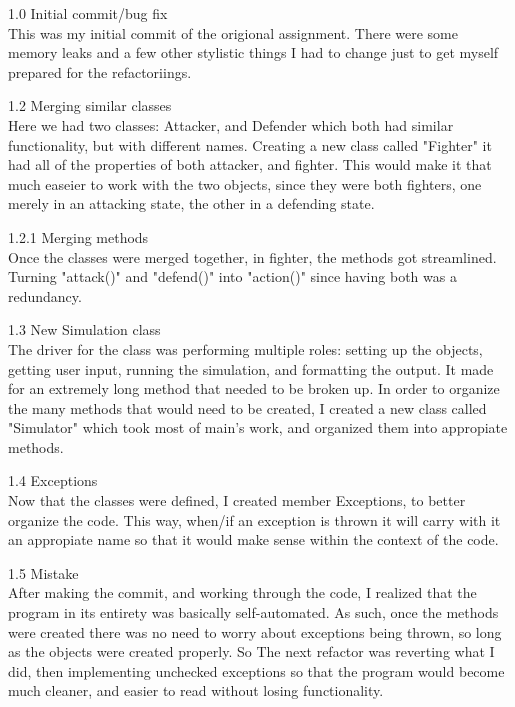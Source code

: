 \documentclass{article}
\begin{document}
		\begin{description}
			\item 1.0 Initial commit/bug fix\hfill \\
				This was my initial commit of the origional assignment. There were some memory leaks and a few
				other stylistic things I had to change just to get myself prepared for the refactoriings.
			\item 1.2 Merging similar classes \hfill \\
				Here we had two classes: Attacker, and Defender which both had similar functionality, but with different names.
				Creating a new class called "Fighter" it had all of the properties of both attacker, and fighter. This would
				make it that much easeier to work with the two objects, since they were both fighters, one merely in an
				attacking state, the other in a defending state.
			\item 1.2.1 Merging methods \hfill \\
				Once the classes were merged together, in fighter, the methods got streamlined. Turning "attack()" and 
				"defend()" into "action()" since having both was a redundancy.
			\item 1.3 New Simulation class \hfill \\
				The driver for the class was performing multiple roles: setting up the objects, getting user input, running 
				the simulation, and formatting the output. It made for an extremely long method that needed to be 
				broken up. In order to organize the many methods that would need to be created, I created a new 
				class called "Simulator" which took most of main's work, and organized them into appropiate methods.
			\item 1.4 Exceptions \hfill \\
				Now that the classes were defined, I created member Exceptions, to better organize the code. This
				way, when/if an exception is thrown it will carry with it an appropiate name so that it would make
				sense within the context of the code.
			\item 1.5 Mistake \hfill \\
				After making the commit, and working through the code, I realized that the program in its entirety
				was basically self-automated. As such, once the methods were created there was no need to worry about
				exceptions being thrown, so long as the objects were created properly. So The next refactor was reverting
				what I did, then implementing unchecked exceptions so that the program would become much cleaner, and
				easier to read without losing functionality.
		\end{description}
\end{document}
